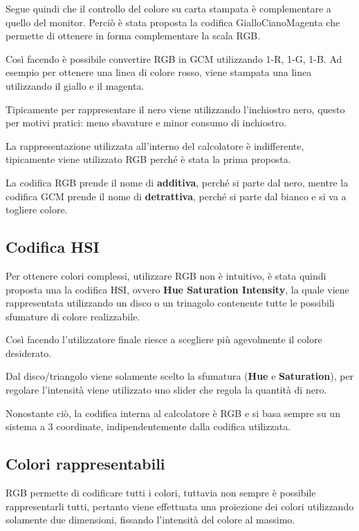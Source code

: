 Segue quindi che il controllo del colore su carta stampata è
complementare a quello del monitor. Perciò è stata proposta la codifica
GialloCianoMagenta che permette di ottenere in forma complementare la
scala RGB.

Così facendo è possibile convertire RGB in GCM utilizzando 1-R, 1-G,
1-B. Ad esempio per ottenere una linea di colore rosso, viene stampata
una linea utilizzando il giallo e il magenta.

Tipicamente per rappresentare il nero viene utilizzando l'inchiostro
nero, questo per motivi pratici: meno sbavature e minor consumo di
inchiostro.

La rappresentazione utilizzata all'interno del calcolatore è
indifferente, tipicamente viene utilizzato RGB perché è stata la prima
proposta.

La codifica RGB prende il nome di \textbf{additiva}, perché si parte dal
nero, mentre la codifica GCM prende il nome di \textbf{detrattiva},
perché si parte dal bianco e si va a togliere colore.

\subsection{Codifica HSI}\label{codifica-hsi}

Per ottenere colori complessi, utilizzare RGB non è intuitivo, è stata
quindi proposta una la codifica HSI, ovvero \textbf{Hue Saturation
Intensity}, la quale viene rappresentata utilizzando un disco o un
trinagolo contenente tutte le possibili sfumature di colore
realizzabile.

Così facendo l'utilizzatore finale riesce a scegliere più agevolmente
il colore desiderato.

Dal disco/triangolo viene solamente scelto la sfumatura (\textbf{Hue} e
\textbf{Saturation}), per regolare l'intensità viene utilizzato uno
slider che regola la quantità di nero.

Nonostante ciò, la codifica interna al calcolatore è RGB e si basa
sempre su un sistema a 3 coordinate, indipendentemente dalla codifica
utilizzata.

\subsection{Colori rappresentabili}\label{colori-rappresentabili}

RGB permette di codificare tutti i colori, tuttavia non sempre è
possibile rappresentarli tutti, pertanto viene effettuata una proiezione
dei colori utilizzando solamente due dimensioni, fissando l'intensità
del colore al massimo.

